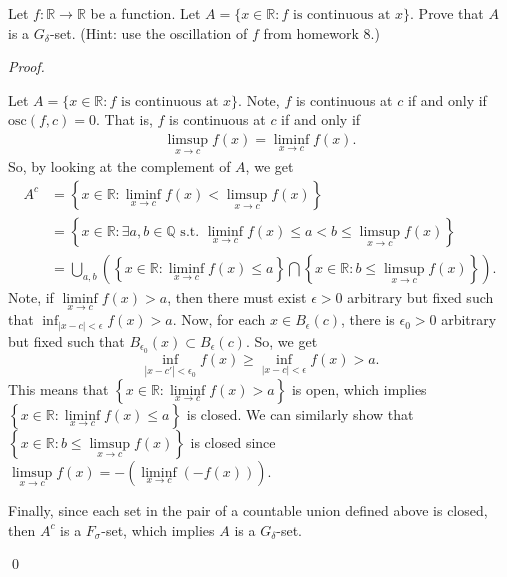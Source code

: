 \documentclass[12pt]{article}
\newenvironment{problem}[2][Problem]{\begin{trivlist}
\item[\hskip \labelsep {\bfseries #1}\hskip \labelsep {\bfseries
#2.}]}{\end{trivlist}}
\newenvironment{sol}
    {\emph{Proof.}
    }
    {
    \qed
    }
\begin{document}
  
  
  
  \begin{problem}{35}
  Let $f : \mathbb{R} \to \mathbb{R}$ be a function. Let $A = \{x \in \mathbb{R} : f \text{ is continuous at } x\}$. Prove that $A$ is a $G_\delta$-set. (Hint: use the oscillation of $f$ from homework 8.)
  \end{problem}
  \begin{sol}
  Let $A = \{x \in \mathbb{R} : f \text{ is continuous at } x\}$. Note, $f$ is continuous at $c$ if and only if $\text{osc}(f,c) = 0$. That is, $f$ is continuous at $c$ if and only if \begin{align*}
      \limsup\limits_{x\to c}f(x) = \liminf\limits_{x \to c}f(x). 
  \end{align*}
  So, by looking at the complement of $A$, we get \begin{align*}
      A^c &= \left\{x \in \mathbb{R} : \liminf\limits_{x \to c}f(x) < \limsup\limits_{x\to c}f(x)\right\} \\
      &= \left\{ x \in \mathbb{R} : \exists a,b \in \mathbb{Q} \text{ s.t. } \liminf\limits_{x \to c}f(x) \leq a < b \leq \limsup\limits_{x\to c}f(x) \right\} \\
      &= \bigcup_{a,b} \left( \left\{ x \in \mathbb{R} : \liminf\limits_{x \to c}f(x) \leq a \right\} \bigcap \left\{ x \in \mathbb{R} : b \leq \limsup\limits_{x\to c}f(x) \right\} \right). \tag*{(with $a < b$)}
  \end{align*}
  \hspace{1em}Note, if $\liminf\limits_{x \to c}f(x) > a$, then there must exist $\epsilon > 0$ arbitrary but fixed such that $\inf_{\left| x - c \right| < \epsilon}f(x) > a$. Now, for each $x \in B_\epsilon(c)$, there is $\epsilon_0 > 0$ arbitrary but fixed such that $B_{\epsilon_0}(x) \subset B_\epsilon(c)$. So, we get $$\inf_{\left| x - c' \right| < \epsilon_0}f(x) \geq \inf_{\left| x - c \right| < \epsilon}f(x) > a.$$ This means that $\left\{ x \in \mathbb{R} : \liminf\limits_{x \to c}f(x) > a \right\}$ is open, which implies $\left\{ x \in \mathbb{R} : \liminf\limits_{x \to c}f(x) \leq a \right\}$ is closed. We can similarly show that $\left\{ x \in \mathbb{R} : b \leq \limsup\limits_{x\to c}f(x) \right\}$ is closed since $\limsup\limits_{x\to c}f(x) = - \left( \liminf\limits_{x \to c}(-f(x)) \right)$.
  
  Finally, since each set in the pair of a countable union defined above is closed, then $A^c$ is a $F_\sigma$-set, which implies $A$ is a $G_\delta$-set.
  \end{sol}
  
\end{document}
